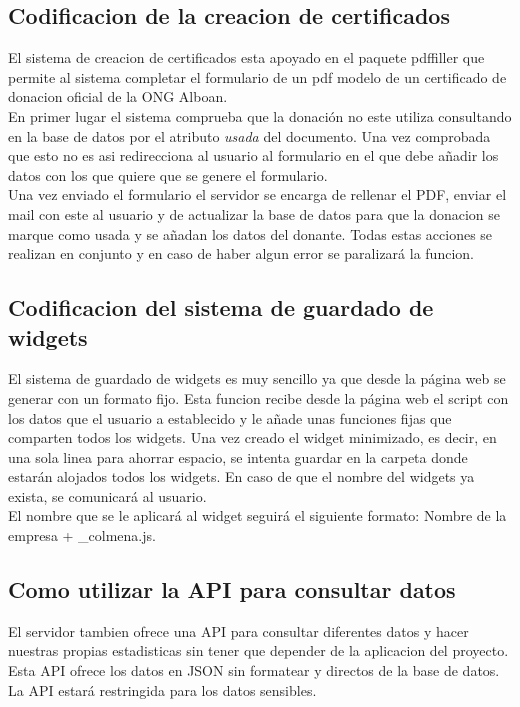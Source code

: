 
\subsection{Codificacion de la creacion de certificados}
El sistema de creacion de certificados esta apoyado en el paquete pdffiller que permite al sistema completar el formulario de un pdf modelo de un certificado de donacion oficial de la ONG Alboan. \\

En primer lugar el sistema comprueba que la donación no este utiliza consultando en la base de datos por el atributo \textit{usada} del documento. Una vez comprobada que esto no es asi redirecciona al usuario al formulario en el que debe añadir los datos con los que quiere que se genere el formulario.\\

Una vez enviado el formulario el servidor se encarga de rellenar el PDF, enviar el mail con este al usuario y de actualizar la base de datos para que la donacion se marque como usada y se añadan los datos del donante. Todas estas acciones se realizan en conjunto y en caso de haber algun error se paralizará la funcion.

\subsection{Codificacion del sistema de guardado de widgets}
El sistema de guardado de widgets es muy sencillo ya que desde la página web se generar con un formato fijo. Esta funcion recibe desde la página web el script con los datos que el usuario a establecido y le añade unas funciones fijas que comparten todos los widgets. Una vez creado el widget minimizado, es decir, en una sola linea para ahorrar espacio, se intenta guardar en la carpeta donde estarán alojados todos los widgets. En caso de que el nombre del widgets ya exista, se comunicará al usuario. \\

El nombre que se le aplicará al widget seguirá el siguiente formato: Nombre de la empresa + \_colmena.js. \\



\subsection{Como utilizar la API para consultar datos}
El servidor tambien ofrece una API para consultar diferentes datos y hacer nuestras propias estadisticas sin tener que depender de la aplicacion del proyecto. Esta API ofrece los datos en JSON sin formatear y directos de la base de datos. La API estará restringida para los datos sensibles.\\

